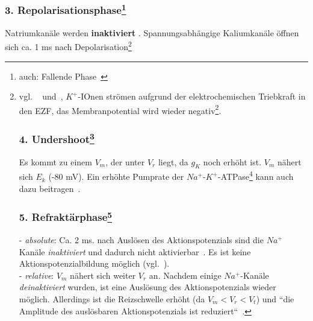 \subsubsection*{3. Repolarisationsphase\footnote{
    auch: Fallende Phase~\cite[105]{BCP18}
}
}
Natriumkanäle werden \textbf{inaktiviert} .
Spannungsabhängige Kaliumkanäle öffnen sich ca. 1 ms nach Depolarisation\footnote{vgl. ~\cite[105]{BCP18} und~\cite[47, Tafel 2.3 (A.2)]{SD07}, $K^+$-IOnen strömen aufgrund der elektrochemischen Triebkraft in den EZF, das Membranpotential wird wieder negativ\footnote{
    Die Kaliumleitfähigkeit wird ``verzögerter Gleichrichter`` genannt, da sie das ursprüngliche Membranpotenzial - mit Verzögerung - wiederherstellt~\cite[103]{BCP18}.
}.


\subsubsection*{4. Undershoot\footnote{
    auch: ``Nachhyperpolarisation``~\cite[46]{SD07}
}}
Es kommt zu einem $V_m$, der unter $V_r$ liegt, da $g_{K}$ noch erhöht ist. $V_m$ nähert sich $E_k$ (-80 mV). Ein erhöhte Pumprate der $Na^+$-$K^+$-ATPase\footnote{
    Die $Na^+$-$K^+$-ATPase ``erhält die Ionenkonzentrationsgradienten aufrecht, die für den Fluss von $Na^+$ und $K^+$ durch die Kanäle während des Aktionspotenzials erforderlich sind``~\cite[105]{BCP18}
} kann auch dazu beitragen~\cite[46]{SD07}.


\subsubsection*{5. Refraktärphase\footnote{
    Die Refraktärphase dient u.a. dazu, die Membran vor einer vorzeitigen Neuerregung zu schützen~\cite[76]{Jon19}.
    Hochfrequenten Aktionspotenzialsalven von max. 1000/s sind aufgrund dieser Eigenschaft möglich (vgl.~\cite[46]{SD07} sowie~\cite[89]{BCP18}).
    \textit{Bear et al.} stellen fest: ``Die Frequenz der Aktionspotenziale ist ein Maß für die Stärke des depolarisierenden Stroms``~\cite[89]{BCP18} - je stärker der Reiz, desto mehr Aktionspotenziale werden nacheinander abgefeuert (vgl.~\cite[90, Abb. 4.3]{BCP18}).
}}

- \textit{absolute}: Ca. 2 ms.
nach Auslösen des Aktionspotenzials sind die $Na^+$ Kanäle  \textit{inaktiviert} und dadurch nicht aktivierbar~\cite[70]{FE19}.
Es ist keine Aktionspotenzialbildung möglich (vgl.~\cite[46]{SD07}).\\
- \textit{relative}: $V_m$ nähert sich weiter $V_r$ an.
Nachdem einige $Na^+$-Kanäle  \textit{deinaktiviert} wurden, ist eine Auslösung des Aktionspotenzials wieder möglich.
Allerdings ist die Reizschwelle erhöht (da $V_m < V_r < V_t$) und ``die Amplitude des auslösbaren Aktionspotenzials ist reduziert``~\cite[70]{FE19}.

}
